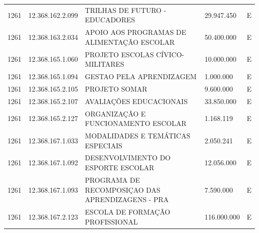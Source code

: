 \documentclass{article}
\begin{document}
\begin{longtable}[c]{m{1cm}|m{2cm}|m{10cm}|m{2cm}|m{1cm}}
\multicolumn{1}{C{1cm}|}{1261} & \multicolumn{1}{C{2cm}|}{12.368.162.2.099} & \multicolumn{1}{L{10cm}|}{TRILHAS DE FUTURO - EDUCADORES} & \multicolumn{1}{R{2cm}|}{29.947.450} & \multicolumn{1}{C{1cm}}{E} \\
\multicolumn{1}{C{1cm}|}{1261} & \multicolumn{1}{C{2cm}|}{12.368.163.2.034} & \multicolumn{1}{L{10cm}|}{APOIO AOS PROGRAMAS DE ALIMENTAÇÃO ESCOLAR} & \multicolumn{1}{R{2cm}|}{50.400.000} & \multicolumn{1}{C{1cm}}{E} \\
\multicolumn{1}{C{1cm}|}{1261} & \multicolumn{1}{C{2cm}|}{12.368.165.1.060} & \multicolumn{1}{L{10cm}|}{PROJETO ESCOLAS CÍVICO-MILITARES} & \multicolumn{1}{R{2cm}|}{10.000.000} & \multicolumn{1}{C{1cm}}{E} \\
\multicolumn{1}{C{1cm}|}{1261} & \multicolumn{1}{C{2cm}|}{12.368.165.1.094} & \multicolumn{1}{L{10cm}|}{GESTAO PELA APRENDIZAGEM} & \multicolumn{1}{R{2cm}|}{1.000.000} & \multicolumn{1}{C{1cm}}{E} \\
\multicolumn{1}{C{1cm}|}{1261} & \multicolumn{1}{C{2cm}|}{12.368.165.2.105} & \multicolumn{1}{L{10cm}|}{PROJETO SOMAR} & \multicolumn{1}{R{2cm}|}{9.600.000} & \multicolumn{1}{C{1cm}}{E} \\
\multicolumn{1}{C{1cm}|}{1261} & \multicolumn{1}{C{2cm}|}{12.368.165.2.107} & \multicolumn{1}{L{10cm}|}{AVALIAÇÕES EDUCACIONAIS} & \multicolumn{1}{R{2cm}|}{33.850.000} & \multicolumn{1}{C{1cm}}{E} \\
\multicolumn{1}{C{1cm}|}{1261} & \multicolumn{1}{C{2cm}|}{12.368.165.2.127} & \multicolumn{1}{L{10cm}|}{ORGANIZAÇÃO E FUNCIONAMENTO ESCOLAR} & \multicolumn{1}{R{2cm}|}{1.168.119} & \multicolumn{1}{C{1cm}}{E} \\
\multicolumn{1}{C{1cm}|}{1261} & \multicolumn{1}{C{2cm}|}{12.368.167.1.033} & \multicolumn{1}{L{10cm}|}{MODALIDADES E TEMÁTICAS ESPECIAIS} & \multicolumn{1}{R{2cm}|}{2.050.241} & \multicolumn{1}{C{1cm}}{E} \\
\multicolumn{1}{C{1cm}|}{1261} & \multicolumn{1}{C{2cm}|}{12.368.167.1.092} & \multicolumn{1}{L{10cm}|}{DESENVOLVIMENTO DO ESPORTE ESCOLAR} & \multicolumn{1}{R{2cm}|}{12.056.000} & \multicolumn{1}{C{1cm}}{E} \\
\multicolumn{1}{C{1cm}|}{1261} & \multicolumn{1}{C{2cm}|}{12.368.167.1.093} & \multicolumn{1}{L{10cm}|}{PROGRAMA DE RECOMPOSIÇAO DAS APRENDIZAGENS - PRA} & \multicolumn{1}{R{2cm}|}{7.590.000} & \multicolumn{1}{C{1cm}}{E} \\
\multicolumn{1}{C{1cm}|}{1261} & \multicolumn{1}{C{2cm}|}{12.368.167.2.123} & \multicolumn{1}{L{10cm}|}{ESCOLA DE FORMAÇÃO PROFISSIONAL} & \multicolumn{1}{R{2cm}|}{116.000.000} & \multicolumn{1}{C{1cm}}{E} \\

\end{longtable}
\end{document}
